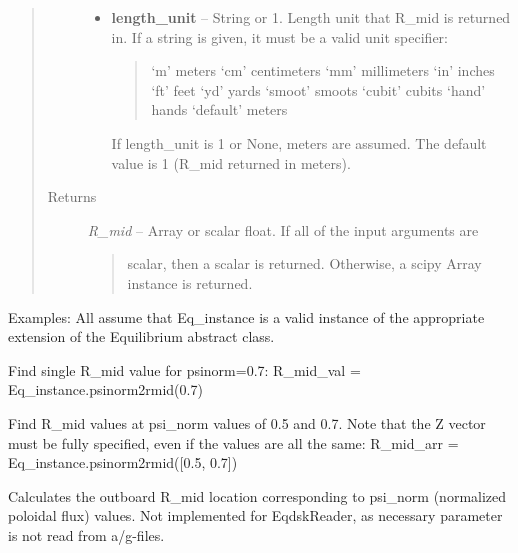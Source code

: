 \documentclass[letterpaper,10pt,english]{sphinxmanual}
\begin{document}
\begin{fulllineitems}
\begin{fulllineitems}
\begin{quote}
\begin{description}
\begin{itemize}
\item {} 
\textbf{length\_unit} --
String or 1. Length unit that R\_mid is returned in. If
a string is given, it must be a valid unit specifier:
\begin{quote}

`m'         meters
`cm'        centimeters
`mm'        millimeters
`in'        inches
`ft'        feet
`yd'        yards
`smoot'     smoots
`cubit'     cubits
`hand'      hands
`default'   meters
\end{quote}

If length\_unit is 1 or None, meters are assumed. The default
value is 1 (R\_mid returned in meters).

\end{itemize}

\item[{Returns}] \leavevmode

\emph{R\_mid} --
Array or scalar float. If all of the input arguments are
\begin{quote}

scalar, then a scalar is returned. Otherwise, a scipy Array
instance is returned.
\end{quote}


\end{description}\end{quote}

Examples:
All assume that Eq\_instance is a valid instance of the appropriate
extension of the Equilibrium abstract class.

Find single R\_mid value for psinorm=0.7:
R\_mid\_val = Eq\_instance.psinorm2rmid(0.7)

Find R\_mid values at psi\_norm values of 0.5 and 0.7.
Note that the Z vector must be fully specified, even if the
values are all the same:
R\_mid\_arr = Eq\_instance.psinorm2rmid({[}0.5, 0.7{]})

\end{fulllineitems}


\begin{fulllineitems}
\label{eqtools:eqtools.eqdskreader.EqdskReader.psinorm2volnorm}
Calculates the outboard R\_mid location corresponding to psi\_norm (normalized poloidal flux) values.
Not implemented for EqdskReader, as necessary parameter
is not read from a/g-files.

\end{fulllineitems}


\end{fulllineitems}
\end{document}

